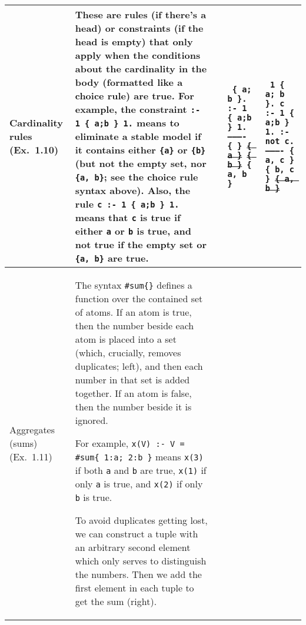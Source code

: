 \documentclass[10pt,a4paper,landscape]{article}
\begin{document}
\begin{longtable}{p{3cm}p{13.5cm}lp{4cm}p{4cm}}
	Cardinality rules \newline (Ex.\ 1.10)
		& These are rules (if there's a head) or constraints (if the head is empty) that only apply when the conditions about the cardinality in the body (formatted like a choice rule) are true.
		For example, the constraint \texttt{:- 1 \{ a;b \} 1.} means to eliminate a stable model if it contains either \texttt{\{a\}} or \texttt{\{b\}} (but not the empty set, nor \texttt{\{a, b\}}; see the choice rule syntax above).		
		Also, the rule \texttt{c :- 1 \{ a;b \} 1.} means that \texttt{c} is true if either \texttt{a} or \texttt{b} is true, and not true if the empty set or \texttt{\{a, b\}} are true.
		&& \texttt{%
			\{ a; b \}. \newline
			:- 1 \{ a;b \} 1. \newline
			---------- \newline
			\{ \} \newline
			\sout{\{ a \}} \newline
			\sout{\{ b \}} \newline			
			\{ a, b \}}
		& \texttt{%
			1 \{ a; b \}. \newline
			c :- 1 \{ a;b \} 1. \newline
			:- not c. \newline
			---------- \newline
			\{ a, c \} \newline
			\{ b, c \} \newline
			\sout{\{ a, b \}} } \\ \midrule
		
	Aggregates (sums) \newline (Ex.\ 1.11)
		& The syntax \texttt{\#sum\{\}} defines a function over the contained set of atoms.
		If an atom is true, then the number beside each atom is placed into a set (which, crucially, removes duplicates; left), and then each number in that set is added together.
		If an atom is false, then the number beside it is ignored. \newline
		
		For example, \texttt{x(V) :- V = \#sum\{ 1:a; 2:b \}} means \texttt{x(3)} if both \texttt{a} and \texttt{b} are true, \texttt{x(1)} if only \texttt{a} is true, and \texttt{x(2)} if only \texttt{b} is true. \newline
		
		To avoid duplicates getting lost, we can construct a tuple with an arbitrary second element which only serves to distinguish the numbers.
		Then we add the first element in each tuple to get the sum (right).
		

\end{longtable}
\end{document}
